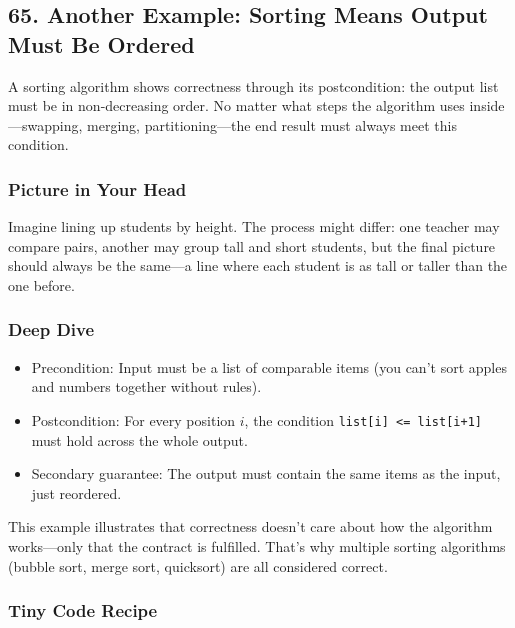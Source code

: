 \documentclass[
  letterpaper,
  DIV=11,
  numbers=noendperiod]{scrreprt}
\providecommand{\tightlist}{%
  \setlength{\itemsep}{0pt}\setlength{\parskip}{0pt}}
\begin{document}
\subsection{65. Another Example: Sorting Means Output Must Be
Ordered}\label{another-example-sorting-means-output-must-be-ordered}

A sorting algorithm shows correctness through its postcondition: the
output list must be in non-decreasing order. No matter what steps the
algorithm uses inside---swapping, merging, partitioning---the end result
must always meet this condition.

\subsubsection{Picture in Your Head}\label{picture-in-your-head-64}

Imagine lining up students by height. The process might differ: one
teacher may compare pairs, another may group tall and short students,
but the final picture should always be the same---a line where each
student is as tall or taller than the one before.

\subsubsection{Deep Dive}\label{deep-dive-34}

\begin{itemize}
\tightlist
\item
  Precondition: Input must be a list of comparable items (you can't sort
  apples and numbers together without rules).
\item
  Postcondition: For every position \(i\), the condition
  \texttt{list{[}i{]}\ \textless{}=\ list{[}i+1{]}} must hold across the
  whole output.
\item
  Secondary guarantee: The output must contain the same items as the
  input, just reordered.
\end{itemize}

This example illustrates that correctness doesn't care about how the
algorithm works---only that the contract is fulfilled. That's why
multiple sorting algorithms (bubble sort, merge sort, quicksort) are all
considered correct.

\subsubsection{Tiny Code Recipe}\label{tiny-code-recipe-62}
\end{document}
